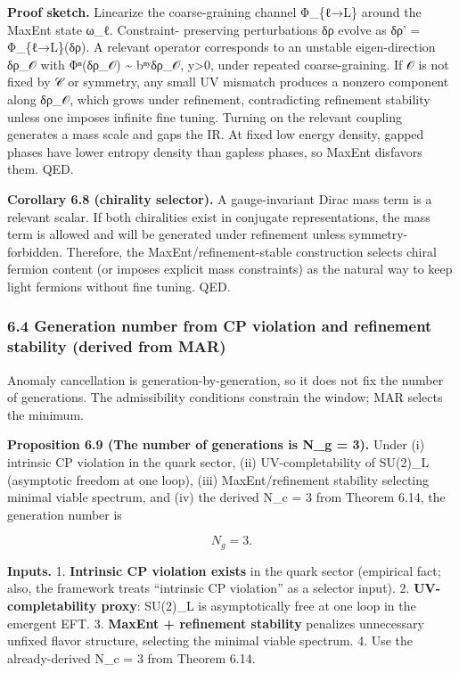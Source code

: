 \documentclass[
]{article}
\begin{document}
\textbf{Proof sketch.} Linearize the coarse-graining channel Φ\_\{ℓ→L\}
around the MaxEnt state ω\_ℓ. Constraint- preserving perturbations δρ
evolve as δρ' = Φ\_\{ℓ→L\}(δρ). A relevant operator corresponds to an
unstable eigen-direction δρ\_𝒪 with \textbar Φⁿ(δρ\_𝒪)\textbar{}
\textasciitilde{} bⁿʸ\textbar δρ\_𝒪\textbar, y\textgreater0, under
repeated coarse-graining. If 𝒪 is not fixed by 𝒞 or symmetry, any small
UV mismatch produces a nonzero component along δρ\_𝒪, which grows under
refinement, contradicting refinement stability unless one imposes
infinite fine tuning. Turning on the relevant coupling generates a mass
scale and gaps the IR. At fixed low energy density, gapped phases have
lower entropy density than gapless phases, so MaxEnt disfavors them.
QED.

\textbf{Corollary 6.8 (chirality selector).} A gauge-invariant Dirac
mass term is a relevant scalar. If both chiralities exist in conjugate
representations, the mass term is allowed and will be generated under
refinement unless symmetry-forbidden. Therefore, the
MaxEnt/refinement-stable construction selects chiral fermion content (or
imposes explicit mass constraints) as the natural way to keep light
fermions without fine tuning. QED.

\subsubsection{6.4 Generation number from CP violation and refinement
stability (derived from
MAR)}\label{generation-number-from-cp-violation-and-refinement-stability-derived-from-mar}

Anomaly cancellation is generation-by-generation, so it does not fix the
number of generations. The admissibility conditions constrain the
window; MAR selects the minimum.

\textbf{Proposition 6.9 (The number of generations is N\_g = 3).} Under
(i) intrinsic CP violation in the quark sector, (ii) UV-completability
of SU(2)\_L (asymptotic freedom at one loop), (iii) MaxEnt/refinement
stability selecting minimal viable spectrum, and (iv) the derived N\_c =
3 from Theorem 6.14, the generation number is

\[
N_g = 3.
\]

\textbf{Inputs.} 1. \textbf{Intrinsic CP violation exists} in the quark
sector (empirical fact; also, the framework treats ``intrinsic CP
violation'' as a selector input). 2. \textbf{UV-completability proxy}:
SU(2)\_L is asymptotically free at one loop in the emergent EFT. 3.
\textbf{MaxEnt + refinement stability} penalizes unnecessary unfixed
flavor structure, selecting the minimal viable spectrum. 4. Use the
already-derived N\_c = 3 from Theorem 6.14.
\end{document}
